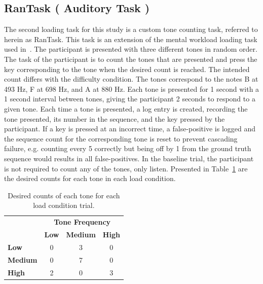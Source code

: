 \documentclass[11pt]{article}
\begin{document}
\subsection{RanTask ( Auditory Task )}
The second loading task for this study is a custom tone counting task, referred to herein as RanTask. This task is an extension of the mental workload loading task used in~\cite{Rantanen}. The participant is presented with three different tones in random order. The task of the participant is to count the tones that are presented and press the key corresponding to the tone when the desired count is reached.  The intended count differs with the difficulty condition. The tones correspond to the notes B at 493 Hz, F at 698 Hz, and A at 880 Hz. Each tone is presented for 1 second with a 1 second interval between tones, giving the participant 2 seconds to respond to a given tone. Each time a tone is presented, a log entry is created, recording the tone presented, its number in the sequence, and the key pressed by the participant. If a key is pressed at an incorrect time, a false-positive is logged and the sequence count for the corresponding tone is reset to prevent cascading failure, e.g. counting every 5 correctly but being off by 1 from the ground truth sequence would results in all false-positives. In the baseline trial, the participant is not required to count any of the tones, only listen. Presented in Table~\ref{tab:ran} are the desired counts for each tone in each load condition.

\begin{table}[h]
\centering
\begin{tabular}{l|ccc}
                                                                     & \multicolumn{3}{c}{\textbf{Tone Frequency}}                                     \\
\rowcolor[HTML]{FFFFFF} 
\multicolumn{1}{c|}{\cellcolor[HTML]{FFFFFF}\textbf{Load Condition}} & \textbf{Low} & \textbf{Medium} & \textbf{High}                                   \\ \hline
\rowcolor[HTML]{FFFFFF} 
\textbf{Low}                                                         & 0          & 3               & \multicolumn{1}{c|}{\cellcolor[HTML]{FFFFFF}0}  \\
\rowcolor[HTML]{EFEFEF} 
\textbf{Medium}                                                      & 0       & 7              & \multicolumn{1}{c|}{\cellcolor[HTML]{EFEFEF}0} \\
\rowcolor[HTML]{FFFFFF} 
\textbf{High}                                                        & 2         & 0              & \multicolumn{1}{c|}{\cellcolor[HTML]{FFFFFF}3} \\ \cline{2-4} 
\end{tabular}
  \caption{Desired counts of each tone for each load condition trial.}
  \label{tab:ran}
\end{table}
\end{document}
